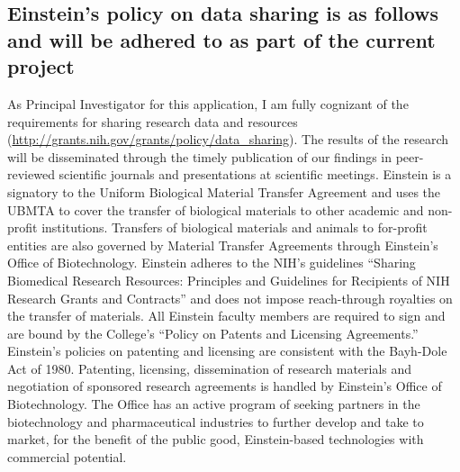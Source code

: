 \subsection{Einstein’s policy on data sharing is as follows and will be adhered to as part of the current project}
As Principal Investigator for this application, I am fully cognizant of the requirements for sharing research data and resources (\url{http://grants.nih.gov/grants/policy/data_sharing}). 
The results of the research will be disseminated through the timely publication of our findings in peer-reviewed scientific journals and presentations at scientific meetings. 
Einstein is a signatory to the Uniform Biological Material Transfer Agreement and uses the UBMTA to cover the transfer of biological materials to other academic and non-profit institutions. 
Transfers of biological materials and animals to for-profit entities are also governed by Material Transfer Agreements through Einstein’s Office of Biotechnology. 
Einstein adheres to the NIH's guidelines \enquote{Sharing Biomedical Research Resources: Principles and Guidelines for Recipients of NIH Research Grants and Contracts} and does not impose reach-through royalties on the transfer of materials. 
All Einstein faculty members are required to sign and are bound by the College's \enquote{Policy on Patents and Licensing Agreements.} 
Einstein's policies on patenting and licensing are consistent with the Bayh-Dole Act of 1980. Patenting, licensing, dissemination of research materials and negotiation of sponsored research agreements is handled by Einstein's Office of Biotechnology. 
The Office has an active program of seeking partners in the biotechnology and pharmaceutical industries to further develop and take to market, for the benefit of the public good, Einstein-based technologies with commercial potential.
